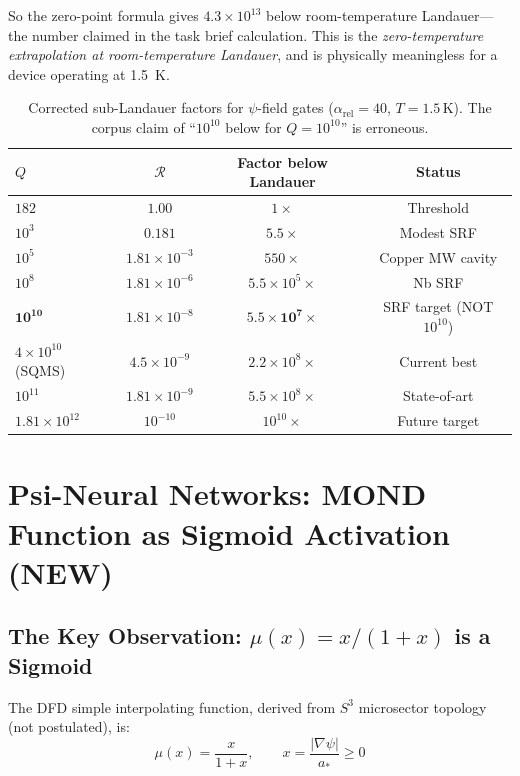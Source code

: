 \documentclass[11pt]{article}
\theoremstyle{definition}
\theoremstyle{remark}
\begin{document}
So the zero-point formula gives $4.3 \times 10^{13}$ below room-temperature
Landauer---the number claimed in the task brief calculation. This is
the \emph{zero-temperature extrapolation at room-temperature Landauer},
and is physically meaningless for a device operating at 1.5~K.

\begin{table}[h]
\centering
\caption{Corrected sub-Landauer factors for $\psi$-field gates
($\alpha_{\mathrm{rel}} = 40$, $T = 1.5\,\mathrm{K}$). The corpus
claim of ``$10^{10}$ below for $Q = 10^{10}$'' is erroneous.}
\label{tab:corrected_landauer}
\begin{tabular}{@{}lccc@{}}
\toprule
$Q$ & $\mathcal{R}$ & Factor below Landauer & Status \\
\midrule
$182$ & $1.00$ & $1\times$ & Threshold \\
$10^3$ & $0.181$ & $5.5\times$ & Modest SRF \\
$10^5$ & $1.81\times 10^{-3}$ & $550\times$ & Copper MW cavity \\
$10^8$ & $1.81\times 10^{-6}$ & $5.5\times 10^5\times$ & Nb SRF \\
$\mathbf{10^{10}}$ & $1.81\times 10^{-8}$ & $\mathbf{5.5\times 10^7\times}$
& SRF target (NOT $10^{10}$) \\
$4\times 10^{10}$ (SQMS) & $4.5\times 10^{-9}$ & $2.2\times 10^8\times$
& Current best \\
$10^{11}$ & $1.81\times 10^{-9}$ & $5.5\times 10^8\times$ & State-of-art \\
$1.81\times 10^{12}$ & $10^{-10}$ & $10^{10}\times$ & Future target \\
\bottomrule
\end{tabular}
\end{table}

\section{Psi-Neural Networks: MOND Function as Sigmoid Activation (NEW)}
\label{sec:psi_neural}

\subsection{The Key Observation: $\mu(x) = x/(1+x)$ is a Sigmoid}
\label{sec:mond_sigmoid}

The DFD simple interpolating function, derived from $S^3$ microsector
topology (not postulated), is:
\begin{equation}
\mu(x) = \frac{x}{1+x}, \qquad x = \frac{|\nabla\psi|}{a_*} \geq 0
\label{eq:mu_function}
\end{equation}
\end{document}
